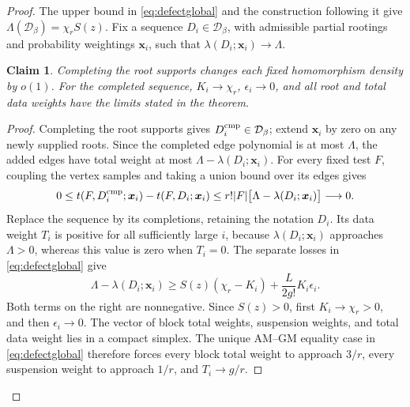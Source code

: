 \documentclass[10pt]{article}
\numberwithin{equation}{section}
\newtheorem{claim}[claim]{Claim}\aliascntresetthe{claim}
\theoremstyle{definition}
\newcommand{\cD}{\mathcal D}\newcommand{\cE}{\mathcal E}\newcommand{\cF}{\mathcal F}
\newcommand{\x}{\boldsymbol{x}}\newcommand{\y}{\boldsymbol{y}}
\begin{document}
\begin{proof}
The upper bound in \eqref{eq:defectglobal} and the construction following it give $\Lambda(\cD_\beta)=\chi_rS(z)$. Fix a sequence $D_i\in\cD_\beta$, with admissible partial rootings and probability weightings $\x_i$, such that $\lambda(D_i;\x_i)\to\Lambda$.

\begin{claim}\label{clm:outerweights}
Completing the root supports changes each fixed homomorphism density by $o(1)$. For the completed sequence, $K_i\to\chi_r$, $\epsilon_i\to0$, and all root and total data weights have the limits stated in the theorem.
\end{claim}
\begin{proof}
Completing the root supports gives $D_i^{\rm cmp}\in\cD_\beta$; extend $\x_i$ by zero on any newly supplied roots. Since the completed edge polynomial is at most $\Lambda$, the added edges have total weight at most $\Lambda-\lambda(D_i;\x_i)$. For every fixed test $F$, coupling the vertex samples and taking a union bound over its edges gives
\[
 0\le t(F,D_i^{\rm cmp};\x_i)-t(F,D_i;\x_i)
       \le r!|F|\bigl[\Lambda-\lambda(D_i;\x_i)\bigr]\longrightarrow0.
\]
Replace the sequence by its completions, retaining the notation $D_i$. Its data weight $T_i$ is positive for all sufficiently large $i$, because $\lambda(D_i;\x_i)$ approaches $\Lambda>0$, whereas this value is zero when $T_i=0$. The separate losses in \eqref{eq:defectglobal} give
\[
 \Lambda-\lambda(D_i;\x_i)
 \ge S(z)(\chi_r-K_i)
       +\frac L{2g!}K_i\epsilon_i.
\]
Both terms on the right are nonnegative. Since $S(z)>0$, first $K_i\to\chi_r>0$, and then $\epsilon_i\to0$. The vector of block total weights, suspension weights, and total data weight lies in a compact simplex. The unique AM--GM equality case in \eqref{eq:defectglobal} therefore forces every block total weight to approach $3/r$, every suspension weight to approach $1/r$, and $T_i\to g/r$.


\end{proof}
\end{proof}
\end{document}
